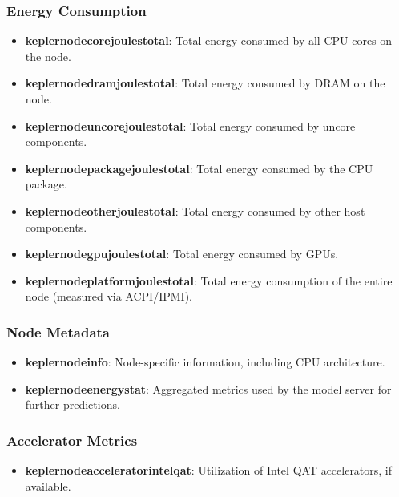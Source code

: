 \subsubsection{Energy Consumption}
\begin{itemize}
    \item \textbf{kepler\textunderscore node\textunderscore core\textunderscore joules\textunderscore total}: Total energy consumed by all CPU cores on the node.
    \item \textbf{kepler\textunderscore node\textunderscore dram\textunderscore joules\textunderscore total}: Total energy consumed by DRAM on the node.
    \item \textbf{kepler\textunderscore node\textunderscore uncore\textunderscore joules\textunderscore total}: Total energy consumed by uncore components.
    \item \textbf{kepler\textunderscore node\textunderscore package\textunderscore joules\textunderscore total}: Total energy consumed by the CPU package.
    \item \textbf{kepler\textunderscore node\textunderscore other\textunderscore joules\textunderscore total}: Total energy consumed by other host components.
    \item \textbf{kepler\textunderscore node\textunderscore gpu\textunderscore joules\textunderscore total}: Total energy consumed by GPUs.
    \item \textbf{kepler\textunderscore node\textunderscore platform\textunderscore joules\textunderscore total}: Total energy consumption of the entire node (measured via ACPI/IPMI).
\end{itemize}

\subsubsection{Node Metadata}
\begin{itemize}
    \item \textbf{kepler\textunderscore node\textunderscore info}: Node-specific information, including CPU architecture.
    \item \textbf{kepler\textunderscore node\textunderscore energy\textunderscore stat}: Aggregated metrics used by the model server for further predictions.
\end{itemize}

\subsubsection{Accelerator Metrics}
\begin{itemize}
    \item \textbf{kepler\textunderscore node\textunderscore accelerator\textunderscore intel\textunderscore qat}: Utilization of Intel QAT accelerators, if available.
\end{itemize}